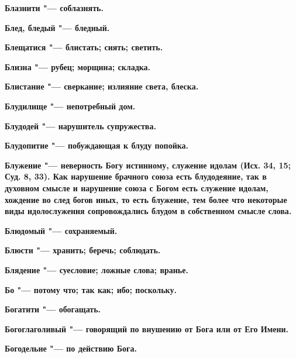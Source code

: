 \begin{mymulticols}{2}
\bfseries Блазнити\normalfont{} "--- соблазнять. 




\bfseries Блед, бледый\normalfont{} "--- бледный. 




\bfseries Блещатися\normalfont{} "--- блистать; сиять; светить. 




\bfseries Близна\normalfont{} "--- рубец; морщина; складка. 




\bfseries Блистание\normalfont{} "--- сверкание; излияние света, блеска. 




\bfseries Блудилище\normalfont{} "--- непотребный дом. 




\bfseries Блудодей\normalfont{} "--- нарушитель супружества. 




\bfseries Блудопитие\normalfont{} "--- побуждающая к блуду попойка. 




\bfseries Блужение\normalfont{} "--- неверность Богу истинному, служение идолам (Исх. 34, 15; Суд. 8, 33). Как нарушение брачного союза есть блудодеяние, так в духовном смысле и нарушение союза с Богом есть служение идолам, хождение во след богов иных, то есть блужение, тем более что некоторые виды идолослужения сопровождались блудом в собственном смысле слова. 




\bfseries Блюдомый\normalfont{} "--- сохраняемый. 




\bfseries Блюсти\normalfont{} "--- хранить; беречь; соблюдать. 




\bfseries Блядение\normalfont{} "--- суесловие; ложные слова; вранье. 




\bfseries Бо\normalfont{} "--- потому что; так как; ибо; поскольку. 




\bfseries Богатити\normalfont{} "--- обогащать. 




\bfseries Богоглаголивый\normalfont{} "--- говорящий по внушению от Бога или от Его Имени. 




\bfseries Богодельне\normalfont{} "--- по действию Бога. 





\end{mymulticols}
